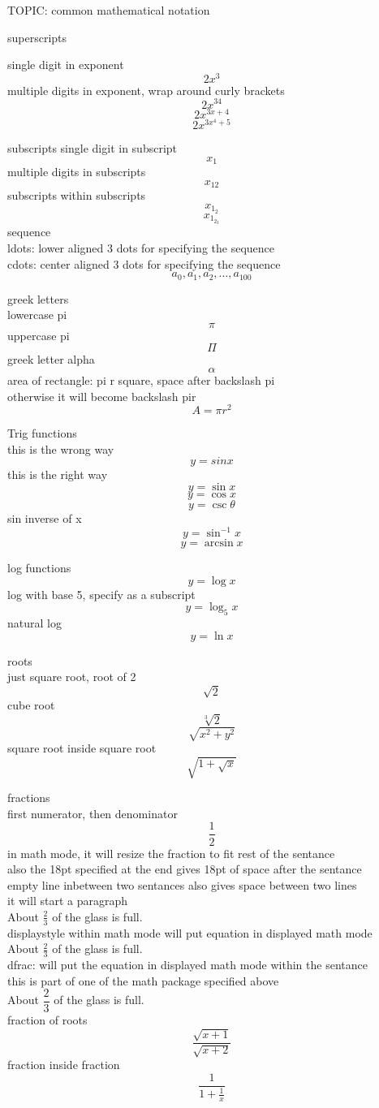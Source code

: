 \documentclass[24pt]{article}
\begin{document}
TOPIC: common mathematical notation

superscripts

single digit in exponent
$$2x^3$$
multiple digits in exponent, wrap around curly brackets
$$2x^{34}$$
$$2x^{3x+4}$$
$$2x^{3x^4+5}$$

subscripts
single digit in subscript
$$x_1$$
multiple digits in subscripts
$$x_{12}$$
subscripts within subscripts
$$x_{1_2}$$
$$x_{1_{2_3}}$$
sequence\\
ldots: lower aligned 3 dots for specifying the sequence\\
cdots: center aligned 3 dots for specifying the sequence\\
$$a_0, a_1, a_2, \ldots, a_{100}$$

greek letters\\
lowercase pi\\
$$\pi$$
uppercase pi\\
$$\Pi$$
greek letter alpha
$$\alpha$$
area of rectangle: pi r square, space after backslash pi\\
otherwise it will become backslash pir\\
$$A=\pi r^2$$

Trig functions\\
this is the wrong way\\
$$y=sin x$$
this is the right way\\
$$y=\sin x$$
$$y=\cos x$$
$$y=\csc \theta$$
sin inverse of x\\
$$y=\sin^{-1} x$$
$$y=\arcsin x$$

log functions
$$y=\log x$$
log with base 5, specify as a subscript\\
$$y=\log_5 x$$
natural log\\
$$y=\ln x$$

roots\\
just square root, root of 2\\
$$\sqrt{2}$$
cube root\\
$$\sqrt[3]{2}$$
$$\sqrt{x^2+y^2}$$
square root inside square root\\
$$\sqrt{   1+\sqrt{x}   }$$

fractions\\
first numerator, then denominator\\
$$\frac{1}{2}$$
in math mode, it will resize the fraction to fit rest of the sentance\\
also the 18pt specified at the end gives 18pt of space after the sentance\\
empty line inbetween two sentances also gives space between two lines\\
it will start a paragraph\\
About $\frac{2}{3}$ of the glass is full.\\[18pt]
displaystyle within math mode will put equation in displayed math mode\\
About $\displaystyle \frac{2}{3}$ of the glass is full.\\[10pt]
dfrac: will put the equation in displayed math mode within the sentance\\
this is part of one of the math package specified above\\
About $\dfrac{2}{3}$ of the glass is full.\\[18pt]

fraction of roots\\
$$\frac{\sqrt{x+1}}{\sqrt{x+2}}$$
fraction inside fraction\\
$$\frac{1}{1+\frac{1}{x}}$$
\end{document}
